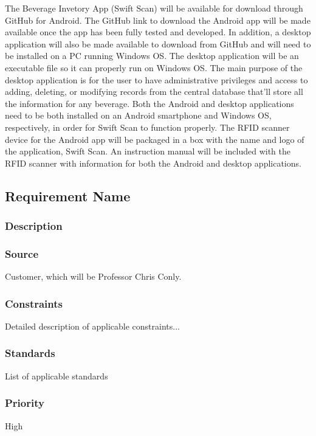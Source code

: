 The Beverage Invetory App (Swift Scan) will be available for download through GitHub for Android.  The GitHub link to download the Android app will be made available once the app has been fully tested and developed.  In addition, a desktop application will also be made available to download from GitHub and will need to be installed on a PC running Windows OS.  The desktop application will be an executable file so it can properly run on Windows OS.  The main purpose of the desktop application is for the user to have administrative privileges and access to adding, deleting, or modifying records from the central database that'll store all the information for any beverage.  Both the Android and desktop applications need to be both installed on an Android smartphone and Windows OS, respectively, in order for Swift Scan to function properly.  The RFID scanner device for the Android app will be packaged in a box with the name and logo of the application, Swift Scan.  An instruction manual will be included with the RFID scanner with information for both the Android and desktop applications.

\subsection{Requirement Name}
\subsubsection{Description}

\subsubsection{Source}
Customer, which will be Professor Chris Conly.
\subsubsection{Constraints}
Detailed description of applicable constraints...
\subsubsection{Standards}
List of applicable standards
\subsubsection{Priority}
High
